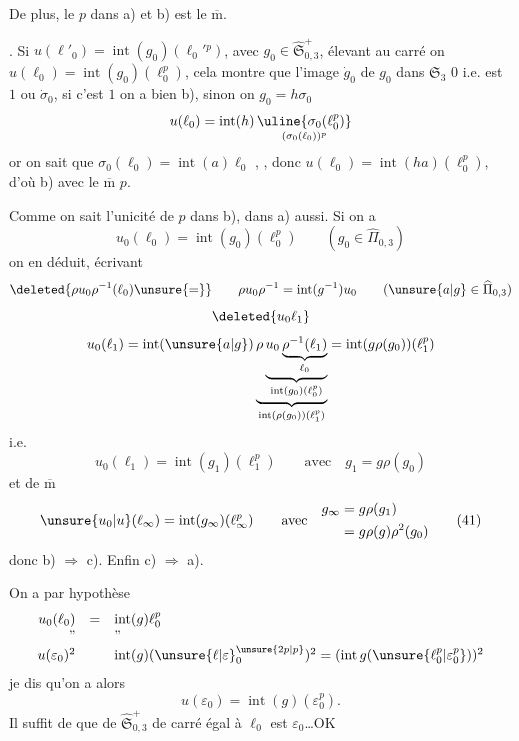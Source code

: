 De plus, le $p$ dans a) et b) est le $\overline{\mathrm m}$.

\uline{}. Si $u(\ell'_0)=\operatorname{int}(g_0)(\ell_0'{}^p)$, avec
$g_0\in\widehat{\mathfrak S}_{0,3}^{+}$,
élevant au carré on  $u(\ell_0)=\operatorname{int}(g_0)(\ell_0^p)$,
cela montre que l'image $\dot g_0$ de $g_0$ dans $\mathfrak S_3$
 $0$ i.e. est  $1$ ou $\dot\sigma_0$,
 si c'est $1$ on a bien b), sinon on 
$g_0=h\sigma_0$ 
\[
u(\ell_0)=\operatorname{int}(h)\,
\underset{(\sigma_0(\ell_0))^p}{\uline{\sigma_0(\ell_0^p)}}
\]
or on sait que $\sigma_0(\ell_0)=\operatorname{int}(a)\ell_0$
,
,
donc $u(\ell_0)=\operatorname{int}(ha)(\ell_0^p)$, d'où b) avec le $\overline{\mathrm m}$ $p$.


Comme on sait l'unicité de $p$ dans b), dans a) aussi. Si on a
\begin{equation}
u_0(\ell_0)=\operatorname{int}(g_0)(\ell_0^p)
\qquad (g_0\in\widehat\Pi_{0,3})
\tag{39}
\end{equation}
on en déduit, écrivant
\[
\deleted{\rho u_0\rho^{-1}(\ell_0)\unsure{=}}
\qquad
\rho u_0\rho^{-1}=\operatorname{int}(g^{-1})u_0
\qquad (\unsure{a|g}\in\widehat\Pi_{0,3})
\]
\[
\deleted{u_0 \ell_1}
\]
\[
u_0(\ell_1)=\operatorname{int}(\unsure{a|g})
\underbrace{\rho\underbrace{u_0\underbrace{\rho^{-1}(\ell_1)}_{\ell_0}}_{
\operatorname{int}(g_0)(\ell_0^p)}}_{
\operatorname{int}(\rho(g_0))(\ell_1^p)}
=\operatorname{int}(g\rho(g_0))(\ell_1^p)
\]
i.e.
\begin{equation}
u_0(\ell_1)=\operatorname{int}(g_1)(\ell_1^p)
\qquad\text{avec}\quad g_1=g\rho(g_0)
\tag{40}
\end{equation}
et de $\overline{\mathrm m}$
\begin{equation}
\unsure{u_0|u}(\ell_\infty)=\operatorname{int}(g_\infty)(\ell_\infty^p)
\qquad\text{avec}\quad
\begin{aligned}
g_\infty&=g\rho(g_1)\\
&=g\rho(g)\rho^2(g_0)
\end{aligned}
\tag{41}
\end{equation}
donc b) $\Rightarrow$ c). Enfin  c) $\Rightarrow$ a).

On a par hypothèse
\[
\begin{array}{rcl}
u_0(\ell_0)&=&\operatorname{int}(g)\ell_0^p\\
\text{''}&&\text{''}\\
u(\varepsilon_0)^2&&
\operatorname{int}(g)(\unsure{\ell|\varepsilon}_0^{\unsure{2p|p}})^2
=(\operatorname{int}g(\unsure{\ell_0^p|\varepsilon_0^p}))^2
\end{array}
\]
je dis qu'on a alors
\[
u(\varepsilon_0)=\operatorname{int}(g)(\varepsilon_0^p).
\]
Il suffit de  que
  de
$\widehat{\mathfrak S}_{0,3}^{+}$ de carré égal à $\ell_0$ est $\varepsilon_0$\ldots\quad OK


